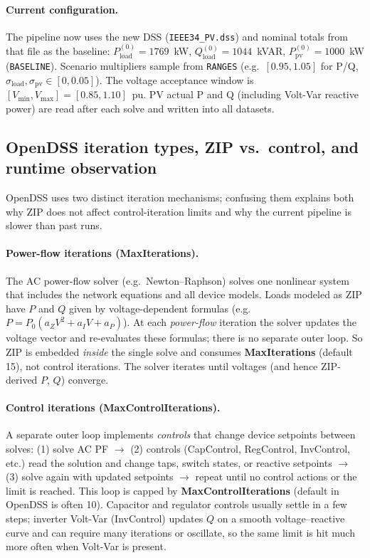 \documentclass[11pt]{article}
\begin{document}
\paragraph{Current configuration.}
The pipeline now uses the new DSS (\texttt{IEEE34\_PV.dss}) and nominal totals from that file as the baseline:
$P_{\mathrm{load}}^{(0)}=1769$~kW, $Q_{\mathrm{load}}^{(0)}=1044$~kVAR, $P_{\mathrm{pv}}^{(0)}=1000$~kW (\texttt{BASELINE}).
Scenario multipliers sample from \texttt{RANGES} (e.g.\ $[0.95,1.05]$ for P/Q, $\sigma_{\mathrm{load}},\sigma_{\mathrm{pv}}\in[0,0.05]$).
The voltage acceptance window is $[V_{\min},V_{\max}]=[0.85,1.10]$~pu.
PV actual P and Q (including Volt-Var reactive power) are read after each solve and written into all datasets.

\subsection*{OpenDSS iteration types, ZIP vs.\ control, and runtime observation}

OpenDSS uses two distinct iteration mechanisms; confusing them explains both why ZIP does not affect control-iteration limits and why the current pipeline is slower than past runs.

\paragraph{Power-flow iterations (MaxIterations).}
The AC power-flow solver (e.g.\ Newton--Raphson) solves one nonlinear system that includes the network equations and all device models. Loads modeled as ZIP have $P$ and $Q$ given by voltage-dependent formulas (e.g.\ $P = P_0(a_Z V^2 + a_I V + a_P)$). At each \emph{power-flow} iteration the solver updates the voltage vector and re-evaluates these formulas; there is no separate outer loop. So ZIP is embedded \emph{inside} the single solve and consumes \textbf{MaxIterations} (default 15), not control iterations. The solver iterates until voltages (and hence ZIP-derived $P$, $Q$) converge.

\paragraph{Control iterations (MaxControlIterations).}
A separate outer loop implements \emph{controls} that change device setpoints between solves: (1) solve AC PF $\to$ (2) controls (CapControl, RegControl, InvControl, etc.) read the solution and change taps, switch states, or reactive setpoints $\to$ (3) solve again with updated setpoints $\to$ repeat until no control actions or the limit is reached. This loop is capped by \textbf{MaxControlIterations} (default in OpenDSS is often 10). Capacitor and regulator controls usually settle in a few steps; inverter Volt-Var (InvControl) updates $Q$ on a smooth voltage--reactive curve and can require many iterations or oscillate, so the same limit is hit much more often when Volt-Var is present.
\end{document}
